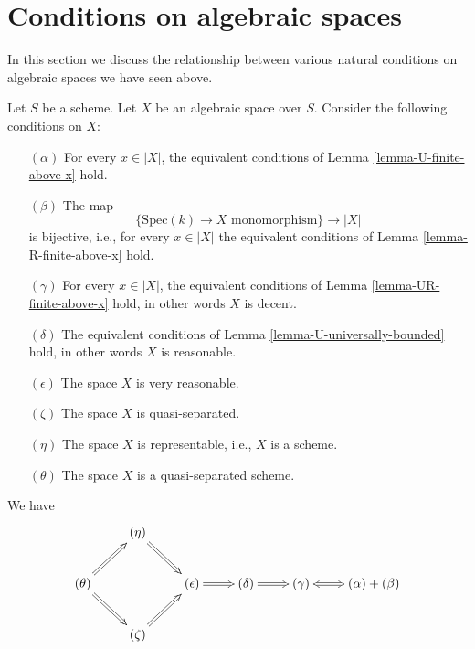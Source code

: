 










\section{Conditions on algebraic spaces}
\label{section-conditions}

\noindent
In this section we discuss the relationship between various natural
conditions on algebraic spaces we have seen above.

\begin{lemma}
\label{lemma-bounded-fibres}
Let $S$ be a scheme. Let $X$ be an algebraic space over $S$.
Consider the following conditions on $X$:
\begin{enumerate}
\item[$(\alpha)$] For every $x \in |X|$, the equivalent conditions of
Lemma \ref{lemma-U-finite-above-x} hold.
\item[$(\beta)$] The map
$$
\{\text{Spec}(k) \to X \text{ monomorphism}\}
\longrightarrow
|X|
$$
is bijective, i.e., for every $x \in |X|$ the equivalent conditions of
Lemma \ref{lemma-R-finite-above-x} hold.
\item[$(\gamma)$] For every $x \in |X|$, the equivalent conditions of
Lemma \ref{lemma-UR-finite-above-x} hold, in other words $X$ is decent.
\item[$(\delta)$] The equivalent conditions of
Lemma \ref{lemma-U-universally-bounded}
hold, in other words $X$ is reasonable.
\item[$(\epsilon)$] The space $X$ is very reasonable.
\item[$(\zeta)$] The space $X$ is quasi-separated.
\item[$(\eta)$] The space $X$ is representable, i.e., $X$ is a scheme.
\item[$(\theta)$] The space $X$ is a quasi-separated scheme.
\end{enumerate}
We have
$$
\xymatrix{
& (\eta) \ar@{=>}[rd] & & & &  \\
(\theta) \ar@{=>}[ru] \ar@{=>}[rd] & & 
(\epsilon) \ar@{=>}[r] &
(\delta) \ar@{=>}[r] &
(\gamma) \ar@{<=>}[r] & (\alpha) + (\beta) \\
& (\zeta) \ar@{=>}[ru] & & & & 
}
$$
\end{lemma}

